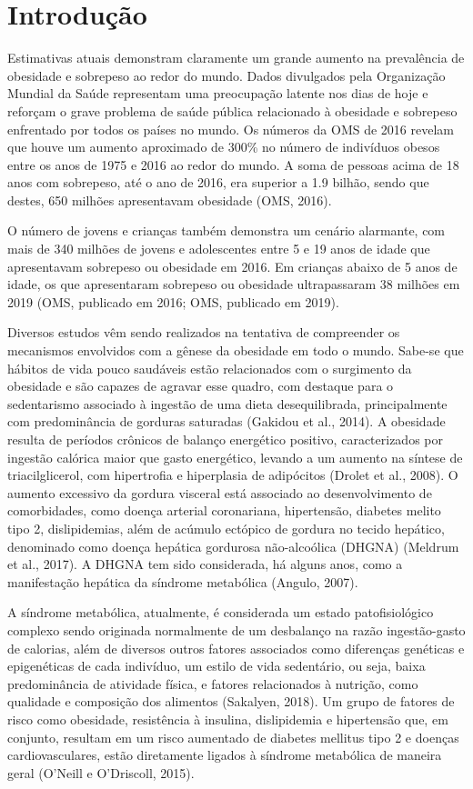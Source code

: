 \documentclass[12pt, a4paper]{article}
\begin{document}
    \section{Introdução}
    \par Estimativas atuais demonstram claramente um grande aumento na prevalência de obesidade e sobrepeso ao redor do mundo. Dados divulgados pela Organização Mundial da Saúde representam uma preocupação latente nos dias de hoje e reforçam o grave problema de saúde pública relacionado à obesidade e sobrepeso enfrentado por todos os países no mundo. Os números da OMS de 2016 revelam que houve um aumento aproximado de 300\% no número de indivíduos obesos entre os anos de 1975 e 2016 ao redor do mundo. A soma de pessoas acima de 18 anos com sobrepeso, até o ano de 2016, era superior a 1.9 bilhão, sendo que destes, 650 milhões apresentavam obesidade (OMS, 2016).
    \par O número de jovens e crianças também demonstra um cenário alarmante, com mais de 340 milhões de jovens e adolescentes entre 5 e 19 anos de idade que apresentavam sobrepeso ou obesidade em 2016. Em crianças abaixo de 5 anos de idade, os que apresentaram sobrepeso ou obesidade ultrapassaram 38 milhões em 2019 (OMS, publicado em 2016; OMS, publicado em 2019).
    \par Diversos estudos vêm sendo realizados na tentativa de compreender os mecanismos envolvidos com a gênese da obesidade em todo o mundo. Sabe-se que hábitos de vida pouco saudáveis estão relacionados com o surgimento da obesidade e são capazes de agravar esse quadro, com destaque para o sedentarismo associado à ingestão de uma dieta desequilibrada, principalmente com predominância de gorduras saturadas (Gakidou et al., 2014). A obesidade resulta de períodos crônicos de balanço energético positivo, caracterizados por ingestão calórica maior que gasto energético, levando a um aumento na síntese de triacilglicerol, com hipertrofia e hiperplasia de adipócitos (Drolet et al., 2008). O aumento excessivo da gordura visceral está associado ao desenvolvimento de comorbidades, como doença arterial coronariana, hipertensão, diabetes melito tipo 2, dislipidemias, além de acúmulo ectópico de gordura no tecido hepático, denominado como doença hepática gordurosa não-alcoólica (DHGNA) (Meldrum et al., 2017). A DHGNA tem sido considerada, há alguns anos, como a manifestação hepática da síndrome metabólica (Angulo, 2007).
    \par A síndrome metabólica, atualmente, é considerada um estado patofisiológico complexo sendo originada normalmente de um desbalanço na razão ingestão-gasto de calorias, além de diversos outros fatores associados como diferenças genéticas e epigenéticas de cada indivíduo, um estilo de vida sedentário, ou seja, baixa predominância de atividade física, e fatores relacionados à nutrição, como qualidade e composição dos alimentos (Sakalyen, 2018). Um grupo de fatores de risco como obesidade, resistência à insulina, dislipidemia e hipertensão que, em conjunto, resultam em um risco aumentado de diabetes mellitus tipo 2 e doenças cardiovasculares, estão diretamente ligados à síndrome metabólica de maneira geral (O'Neill e O'Driscoll, 2015).
\end{document}

